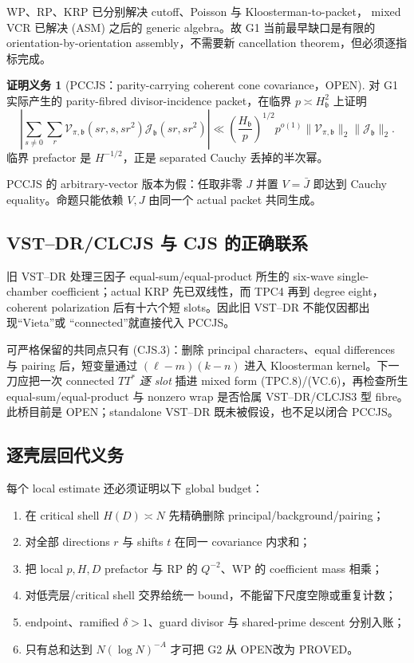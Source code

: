 \documentclass[11pt,a4paper]{ctexart}
\theoremstyle{definition}
\newtheorem{obligation}[theorem]{证明义务}
\newcommand{\1}{\mathbf 1}
\newcommand{\PROVED}{\textcolor{green!40!black}{\textsf{PROVED}}}
\newcommand{\OPEN}{\textcolor{red!70!black}{\textsf{OPEN}}}
\begin{document}
WP、RP、KRP 已分别解决 cutoff、Poisson 与 Kloosterman-to-packet，
mixed VCR 已解决 (ASM) 之后的 generic algebra。故 G1 当前最早缺口是有限的
orientation-by-orientation assembly，不需要新 cancellation theorem，但必须逐指标完成。

\begin{obligation}[PCCJS：parity-carrying coherent cone covariance，\OPEN]
对 G1 实际产生的 parity-fibred divisor-incidence packet，在临界
$p\asymp H_{\mathfrak b}^2$ 上证明
\[
 \left|\sum_{s\ne0}\sum_r
 \mathcal V_{\pi,\mathfrak b}(sr,s,sr^2)
 \mathcal J_{\mathfrak b}(sr,sr^2)\right|
 \ll \left(\frac{H_{\mathfrak b}}p\right)^{1/2}p^{o(1)}
 \|\mathcal V_{\pi,\mathfrak b}\|_2
 \|\mathcal J_{\mathfrak b}\|_2.                  \tag{PCCJS}
\]
临界 prefactor 是 $H^{-1/2}$，正是 separated Cauchy 丢掉的半次幂。
\end{obligation}

PCCJS 的 arbitrary-vector 版本为假：任取非零 $J$ 并置 $V=\bar J$ 即达到
Cauchy equality。命题只能依赖 $V,J$ 由同一个 actual packet 共同生成。

\subsection{VST--DR/CLCJS 与 CJS 的正确联系}

旧 VST--DR 处理三因子 equal-sum/equal-product 所生的 six-wave single-chamber
coefficient；actual KRP 先已双线性，而 TPC4 再到 degree eight，coherent
polarization 后有十六个短 slots。因此旧 VST--DR 不能仅因都出现“Vieta”或
“connected”就直接代入 PCCJS。

可严格保留的共同点只有 (CJS.3)：删除 principal characters、equal differences
与 pairing 后，短变量通过
\(
 (\ell-m)(k-n)
\)
进入 Kloosterman kernel。下一刀应把一次 connected $TT^*$ \emph{逐 slot}
插进 mixed form (TPC.8)/(VC.6)，再检查所生 equal-sum/equal-product 与 nonzero
wrap 是否恰属 VST--DR/CLCJS3 型 fibre。此桥目前是 \OPEN；standalone VST--DR
既未被假设，也不足以闭合 PCCJS。

\subsection{逐壳层回代义务}

每个 local estimate 还必须证明以下 global budget：
\begin{enumerate}
\item 在 critical shell $H(D)\asymp N$ 先精确删除 principal/background/pairing；
\item 对全部 directions $r$ 与 shifts $t$ 在同一 covariance 内求和；
\item 把 local $p,H,D$ prefactor 与 RP 的 $Q^{-2}$、WP 的 coefficient mass 相乘；
\item 对低壳层/critical shell 交界给统一 bound，不能留下尺度空隙或重复计数；
\item endpoint、ramified $\delta>1$、guard divisor 与 shared-prime descent 分别入账；
\item 只有总和达到 $N(\log N)^{-A}$ 才可把 G2 从 \OPEN 改为 \PROVED。
\end{enumerate}
\end{document}
